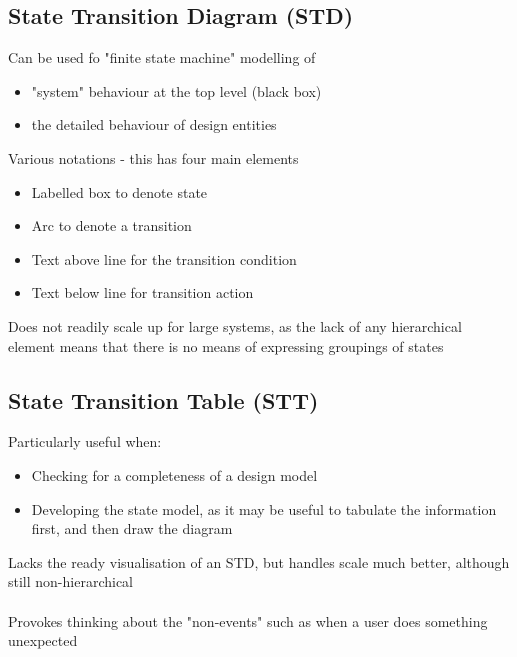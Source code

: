 \documentclass{article}[18pt]
\begin{document}
\subsection{State Transition Diagram (STD)}
Can be used fo "finite state machine" modelling of
\begin{itemize}
	\item "system" behaviour at the top level (black box)
	\item the detailed behaviour of design entities
\end{itemize}
Various notations - this has four main elements
\begin{itemize}
	\item Labelled box to denote state
	\item Arc to denote a transition
	\item Text above line for the transition condition
	\item Text below line for transition action
\end{itemize}
Does not readily scale up for large systems, as the lack of any hierarchical element means that there is no means of expressing groupings of states
\subsection{State Transition Table (STT)}
Particularly useful when:
\begin{itemize}
	\item Checking for a completeness of a design model
	\item Developing the state model, as it may be useful to tabulate the information first, and then draw the diagram
\end{itemize} 
Lacks the ready visualisation of an STD, but handles scale much better, although still non-hierarchical\\
\\
Provokes thinking about the "non-events" such as when a user does something unexpected
\end{document}
